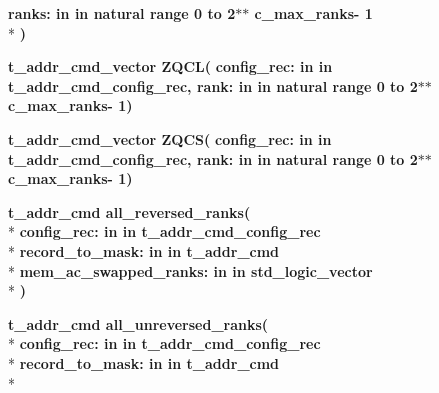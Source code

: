 \begin{DoxyCompactItemize}
{\bfseries \textcolor{vhdlchar}{ranks\+: }\textcolor{stringliteral}{in }\textcolor{vhdlchar}{in natural   range  0 to  2$\ast$$\ast$   c\+\_\+max\+\_\+ranks-\/ 1}}\\*
{\bfseries  )} 
\item 
{\bfseries {\bfseries \textcolor{vhdlchar}{t\+\_\+addr\+\_\+cmd\+\_\+vector}\textcolor{vhdlchar}{ }}} {\bf Z\+Q\+CL}{\bfseries  ( }{\bfseries \textcolor{vhdlchar}{config\+\_\+rec\+: }\textcolor{stringliteral}{in }\textcolor{vhdlchar}{in t\+\_\+addr\+\_\+cmd\+\_\+config\+\_\+rec}}{\bfseries  , \textcolor{vhdlchar}{rank\+: }\textcolor{stringliteral}{in }\textcolor{vhdlchar}{in natural   range  0 to  2$\ast$$\ast$   c\+\_\+max\+\_\+ranks-\/ 1}}{\bfseries  )} 
\item 
{\bfseries {\bfseries \textcolor{vhdlchar}{t\+\_\+addr\+\_\+cmd\+\_\+vector}\textcolor{vhdlchar}{ }}} {\bf Z\+Q\+CS}{\bfseries  ( }{\bfseries \textcolor{vhdlchar}{config\+\_\+rec\+: }\textcolor{stringliteral}{in }\textcolor{vhdlchar}{in t\+\_\+addr\+\_\+cmd\+\_\+config\+\_\+rec}}{\bfseries  , \textcolor{vhdlchar}{rank\+: }\textcolor{stringliteral}{in }\textcolor{vhdlchar}{in natural   range  0 to  2$\ast$$\ast$   c\+\_\+max\+\_\+ranks-\/ 1}}{\bfseries  )} 
\item 
{\bfseries {\bfseries \textcolor{vhdlchar}{t\+\_\+addr\+\_\+cmd}\textcolor{vhdlchar}{ }}} {\bf all\+\_\+reversed\+\_\+ranks}{\bfseries  ( }\\*
{\bfseries \textcolor{vhdlchar}{config\+\_\+rec\+: }\textcolor{stringliteral}{in }\textcolor{vhdlchar}{in t\+\_\+addr\+\_\+cmd\+\_\+config\+\_\+rec}}\\*
{\bfseries \textcolor{vhdlchar}{record\+\_\+to\+\_\+mask\+: }\textcolor{stringliteral}{in }\textcolor{vhdlchar}{in t\+\_\+addr\+\_\+cmd}}\\*
{\bfseries \textcolor{vhdlchar}{mem\+\_\+ac\+\_\+swapped\+\_\+ranks\+: }\textcolor{stringliteral}{in }\textcolor{vhdlchar}{in std\+\_\+logic\+\_\+vector}}\\*
{\bfseries  )} 
\item 
{\bfseries {\bfseries \textcolor{vhdlchar}{t\+\_\+addr\+\_\+cmd}\textcolor{vhdlchar}{ }}} {\bf all\+\_\+unreversed\+\_\+ranks}{\bfseries  ( }\\*
{\bfseries \textcolor{vhdlchar}{config\+\_\+rec\+: }\textcolor{stringliteral}{in }\textcolor{vhdlchar}{in t\+\_\+addr\+\_\+cmd\+\_\+config\+\_\+rec}}\\*
{\bfseries \textcolor{vhdlchar}{record\+\_\+to\+\_\+mask\+: }\textcolor{stringliteral}{in }\textcolor{vhdlchar}{in t\+\_\+addr\+\_\+cmd}}\\*

\end{DoxyCompactItemize}
